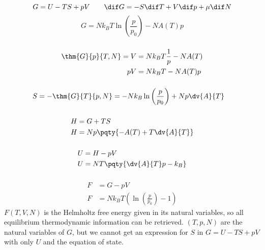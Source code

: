 \documentclass[12pt]{article}
\begin{document}
        \subsection{} {  \[
            G = U - TS + pV\qquad \dif G = - S \dif T + V \dif p +\mu \dif N
        \]}
        \[
            G = Nk_BT \ln \left(\frac{p}{p_0}\right) - NA(T)p
        \]
            \subsubsection{} { \begin{align*}
                \thm{G}{p}{T,N} = V &= N k_BT \frac{1}{p} - NA(T)\\
                pV &= N k_BT - NA(T)p
            \end{align*}}
            \subsubsection{} {  \begin{align*}
                S = -\thm{G}{T}{p,N} &= - N k_B \ln\left(\frac{p}{p_0}\right) + Np \dv{A}{T} 
            \end{align*}}
            \subsubsection{} {  \begin{align*}
                H &=  G + TS\\
                H &= Np\pqty{- A(T) + T \dv{A}{T} }
            \end{align*}}
            \subsubsection{} {  \begin{align*}
                U &= H - pV\\
                U &= N T \pqty{\dv{A}{T} p- k_B}
            \end{align*}}
            \subsubsection{} {  \begin{align*}
                F &= G - pV\\
                F &= Nk_BT \left({\ln \left(\frac{p}{p_0}\right) - 1}\right)
            \end{align*}}
            \(F(T,V,N)\) is the Helmholtz free energy given in its natural variables, so all equilibrium thermodynamic information can be retrieved.
            \((T,p,N)\) are the natural variables of \(G\), but we cannot get an expression for $S$ in \( G = U - TS + pV\) with only \(U\) and the equation of state.
\end{document}
